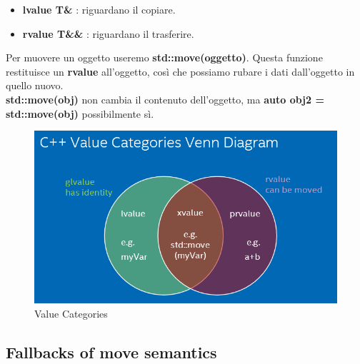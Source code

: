 \begin{itemize}
	\item \textsf{\small \textbf{lvalue T\&} : riguardano il copiare.}
	\item \textsf{\small \textbf{rvalue T\&\&} : riguardano il trasferire.}
\end{itemize}

\textsf{\small Per muovere un oggetto useremo \textbf{std::move(oggetto)}. Questa funzione restituisce un \textbf{rvalue} all'oggetto, così che possiamo rubare i dati dall'oggetto in quello nuovo.} \\

\textsf{\small \textbf{std::move(obj)} non cambia il contenuto dell'oggetto, ma \textbf{auto obj2 = std::move(obj)} possibilmente sì.} \\

\begin{figure}[H]
	\centering
	\includegraphics[width=1\textwidth, height=1\textheight, keepaspectratio]{./imgs/value_categories.png}
	\caption{Value Categories}
	\label{fig:value_categories}
\end{figure}

\subsection{Fallbacks of move semantics}


